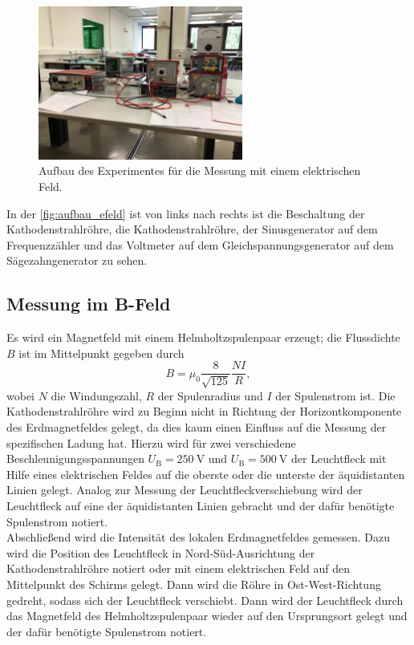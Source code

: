     \begin{figure}[H]
        \centering
        \includegraphics[width=0.6\textwidth]{bilder/foto_elektrisch.jpeg}
        \caption{Aufbau des Experimentes für die Messung mit einem elektrischen Feld.}
        \label{fig:aufbau_efeld}
    \end{figure} 

    \noindent In der \autoref{fig:aufbau_efeld} ist von links nach rechts ist die Beschaltung der Kathodenstrahlröhre, die Kathodenstrahlröhre, der Sinusgenerator auf dem 
    Frequenzzähler und das Voltmeter auf dem Gleichspannungsgenerator auf dem Sägezahngenerator zu sehen.

\subsection{Messung im B-Feld}

    Es wird ein Magnetfeld mit einem Helmholtzspulenpaar erzeugt; die Flussdichte $B$ ist im Mittelpunkt gegeben durch 
    \begin{equation} \label{eqn:B}
        B = \mu_0 \frac{8}{\sqrt{125}} \frac{N I}{R},
    \end{equation}
    wobei $N$ die Windungszahl, $R$ der Spulenradius und $I$ der Spulenstrom ist. Die Kathodenstrahlröhre wird zu Beginn nicht in Richtung der Horizontkomponente
    des Erdmagnetfeldes gelegt, da dies kaum einen Einfluss auf die Messung der spezifischen Ladung hat. Hierzu wird für zwei verschiedene Beschleunigungsspannungen 
    $U_{\text{B}} = \SI{250}{\volt}$ und $U_{\text{B}} = \SI{500}{\volt}$ der Leuchtfleck mit Hilfe eines elektrischen Feldes auf die oberste oder die unterste der
    äquidistanten Linien gelegt. Analog zur Messung der Leuchtfleckverschiebung wird der Leuchtfleck auf eine der äquidistanten Linien gebracht und der dafür benötigte
    Spulenstrom notiert. \\

    \noindent Abschließend wird die Intensität des lokalen Erdmagnetfeldes gemessen. Dazu wird die Position des Leuchtfleck in Nord-Süd-Ausrichtung der 
    Kathodenstrahlröhre notiert oder mit einem elektrischen Feld auf den Mittelpunkt des Schirms gelegt. Dann wird die Röhre in Ost-West-Richtung gedreht, sodass
    sich der Leuchtfleck verschiebt. Dann wird der Leuchtfleck durch das Magnetfeld des Helmholtzspulenpaar wieder auf den Ursprungsort gelegt und der 
    dafür benötigte Spulenstrom notiert. \\

